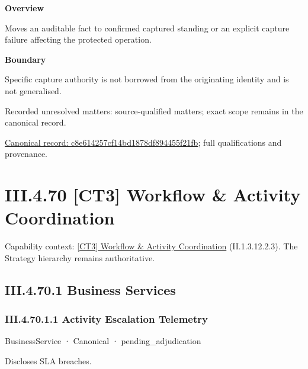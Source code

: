 \textbf{Overview}



Moves an auditable fact to confirmed captured standing or an explicit capture failure affecting the protected operation.



\textbf{Boundary}



Specific capture authority is not borrowed from the originating identity and is not generalised.


{\small Recorded unresolved matters: source-qualified matters; exact scope remains in the canonical record.}\par
{\footnotesize \href{../../../../continuum/business/business-function/c8e614257cf14bd1878df894455f21fb.md}{Canonical record: c8e614257cf14bd1878df894455f21fb}; full qualifications and provenance.}\par
\section*{III.4.70 [CT3] Workflow \& Activity Coordination}
\label{navigation:III.4.70}

{\small Capability context: \hyperref[element:94c683c7588f475e973b58cb226345db]{[CT3] Workflow \& Activity Coordination} (II.1.3.12.2.3). The Strategy hierarchy remains authoritative.}\par
\subsection*{III.4.70.1 Business Services}
\label{navigation:III.4.70.1}

\subsubsection*{III.4.70.1.1 Activity Escalation Telemetry}
\label{navigation:III.4.70.1.1}

\label{element:f6c353c9349d47daadd59e57821ad03b}
{\small BusinessService · Canonical · pending\_adjudication}\par

Discloses SLA breaches.


